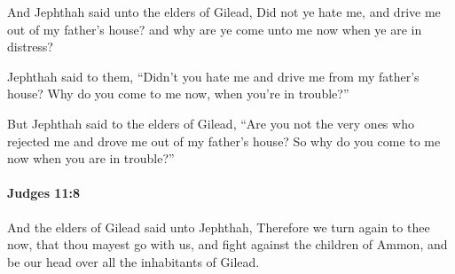 			\begin{versebox}
					\item[BHS] 
					\item[ASV] And Jephthah said unto the elders of Gilead, Did not ye hate me, and drive me out of my father's house? and why are ye come unto me now when ye are in distress?
					\item[NIV] Jephthah said to them, “Didn’t you hate me and drive me from my father’s house? Why do you come to me now, when you’re in trouble?”
					\item[NRSV] But Jephthah said to the elders of Gilead, “Are you not the very ones who rejected me and drove me out of my father’s house? So why do you come to me now when you are in trouble?”
			\end{versebox}

		\paragraph{Judges 11:8} %
			\label{JUDGES-11-8}

			And the elders of Gilead said unto Jephthah, Therefore we turn again to thee now, that thou mayest go with us, and fight against the children of Ammon, and be our head over all the inhabitants of Gilead.

